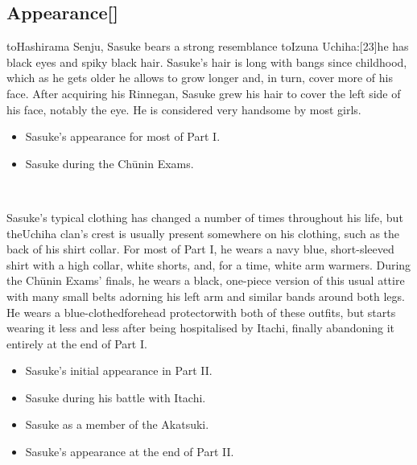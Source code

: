 \documentclass[a4paper,12pt]{article}
\begin{document}
\subsection*{Appearance[]}\n\nAccording toHashirama Senju, Sasuke bears a strong resemblance toIzuna Uchiha:[23]he has black eyes and spiky black hair. Sasuke's hair is long with bangs since childhood, which as he gets older he allows to grow longer and, in turn, cover more of his face. After acquiring his Rinnegan, Sasuke grew his hair to cover the left side of his face, notably the eye. He is considered very handsome by most girls.\\ \par \vspace{0.5cm}

\begin{itemize}
\item Sasuke's appearance for most of Part I.
\item Sasuke during the Chūnin Exams.
\end{itemize}\\ \par \vspace{0.5cm}

Sasuke's typical clothing has changed a number of times throughout his life, but theUchiha clan's crest is usually present somewhere on his clothing, such as the back of his shirt collar. For most of Part I, he wears a navy blue, short-sleeved shirt with a high collar, white shorts, and, for a time, white arm warmers. During the Chūnin Exams' finals, he wears a black, one-piece version of this usual attire with many small belts adorning his left arm and similar bands around both legs. He wears a blue-clothedforehead protectorwith both of these outfits, but starts wearing it less and less after being hospitalised by Itachi, finally abandoning it entirely at the end of Part I.\\ \par \vspace{0.5cm}

\begin{itemize}
\item Sasuke's initial appearance in Part II.
\item Sasuke during his battle with Itachi.
\item Sasuke as a member of the Akatsuki.
\item Sasuke's appearance at the end of Part II.
\end{itemize}\\ \par \vspace{0.5cm}
\end{document}
